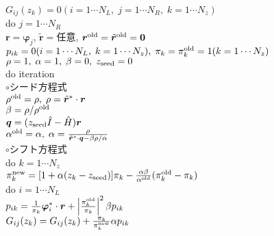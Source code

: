 \documentclass[12pt,titlepage]{jarticle}
\begin{document}
\noindent
$G_{i j}(z_k) = 0 (i=1 \cdots N_L,\; j = 1 \cdots N_R,\; k=1 \cdots N_z)$
\\
do $j = 1 \cdots N_R$
\\\hspace{0.5cm}
${\boldsymbol r} = {\boldsymbol \varphi_j}$, ${\tilde {\boldsymbol r}} = $任意,
${\boldsymbol r}^{\rm old} = {\tilde {\boldsymbol r}}^{\rm old} = {\bf 0}$
\\\hspace{0.5cm}
$p_{i k} = 0(i=1 \cdots N_L,\; k=1 \cdots N_z),\; \pi_k=\pi_k^{\rm old} = 1(k=1 \cdots N_z)$ 
\\\hspace{0.5cm}
$\rho = 1,\; \alpha = 1,\; \beta=0,\; z_{\rm seed}=0$ 
\\\hspace{0.5cm}
do iteration
\\\hspace{1.0cm}
$\circ$シード方程式
\\\hspace{1.0cm}
$\rho^{\rm old} = \rho,\; \rho = {\tilde {\boldsymbol r}}^* \cdot {\boldsymbol r}$
\\\hspace{1.0cm}
$\beta = \rho / \rho^{\rm old}$
\\\hspace{1.0cm}
${\boldsymbol q} = (z_{\rm seed} {\hat I} - {\hat H}){\boldsymbol r}$
\\\hspace{1.0cm}
$\alpha^{\rm old} = \alpha,\; 
\alpha = \frac{\rho}{{\tilde {\boldsymbol r}}^*\cdot{\boldsymbol q} - \beta \rho / \alpha }$
\\\hspace{1.0cm}
$\circ$シフト方程式
\\\hspace{1.0cm}
do $k = 1 \cdots N_z$
\\\hspace{1.5cm}
$\pi_k^{\rm new} = [1+\alpha(z_k-z_{\rm seed})]\pi_k - \frac{\alpha \beta}{\alpha^{\rm old}}(\pi_k^{\rm old} - \pi_k)$
\\\hspace{1.5cm}
do $i = 1 \cdots N_L$
\\\hspace{2.0cm}
$p_{i k} = \frac{1}{\pi_k} {\boldsymbol \varphi}_i^* \cdot {\boldsymbol r} + 
\left|\frac{\pi^{\rm old}_k}{\pi_k } \right|^2 \beta p_{i k}$
\\\hspace{2.0cm}
$G_{i j}(z_k) = G_{i j}(z_k) + \frac{\pi_k}{\pi_k^{\rm new}} \alpha p_{i k}$
\end{document}
